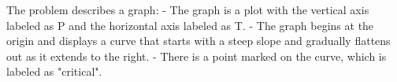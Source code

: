The problem describes a graph:
- The graph is a plot with the vertical axis labeled as P and the horizontal axis labeled as T.
- The graph begins at the origin and displays a curve that starts with a steep slope and gradually flattens out as it extends to the right.
- There is a point marked on the curve, which is labeled as "critical".